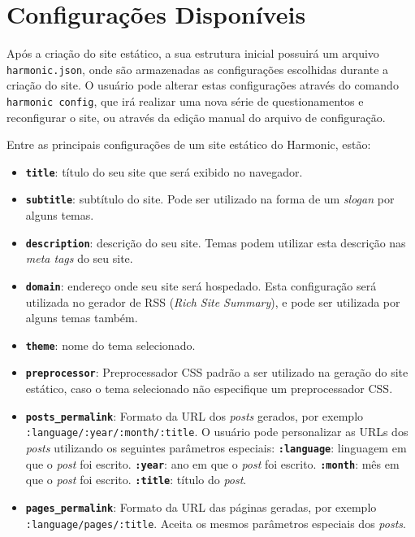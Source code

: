 \documentclass[ppginf, pep]{esinucpel}
\newcommand{\code}[1]{\texttt{#1}}
\begin{document}
\section{Configurações Disponíveis}

Após a criação do site estático, a sua estrutura inicial possuirá um arquivo \code{harmonic.json}, onde são armazenadas as configurações escolhidas durante a criação do site. O usuário pode alterar estas configurações através do comando \code{harmonic config}, que irá realizar uma nova série de questionamentos e reconfigurar o site, ou através da edição manual do arquivo de configuração.

Entre as principais configurações de um site estático do Harmonic, estão:

\begin{itemize}
	\item \textbf{\code{title}}: título do seu site que será exibido no navegador.
	\item \textbf{\code{subtitle}}: subtítulo do site. Pode ser utilizado na forma de um \textit{slogan} por alguns temas.
	\item \textbf{\code{description}}: descrição do seu site. Temas podem utilizar esta descrição nas \textit{meta tags} do seu site.
    \item \textbf{\code{domain}}: endereço onde seu site será hospedado. Esta configuração será utilizada no gerador de RSS (\textit{Rich Site Summary}), e pode ser utilizada por alguns temas também.
    \item \textbf{\code{theme}}: nome do tema selecionado.
    \item \textbf{\code{preprocessor}}: Preprocessador CSS padrão a ser utilizado na geração do site estático, caso o tema selecionado não especifique um preprocessador CSS.
    \item \textbf{\code{posts\_permalink}}: Formato da URL dos \textit{posts} gerados, por exemplo \code{:language/:year/:month/:title}. O usuário pode personalizar as URLs dos \textit{posts} utilizando os seguintes parâmetros especiais:
        \subitem \textbf{\code{:language}}: linguagem em que o \textit{post} foi escrito.
        \subitem \textbf{\code{:year}}: ano em que o \textit{post} foi escrito.
        \subitem \textbf{\code{:month}}: mês em que o \textit{post} foi escrito.
        \subitem \textbf{\code{:title}}: título do \textit{post}.
    \item \textbf{\code{pages\_permalink}}: Formato da URL das páginas geradas, por exemplo \code{:language/pages/:title}. Aceita os mesmos parâmetros especiais dos \textit{posts}.

\end{itemize}
\end{document}
